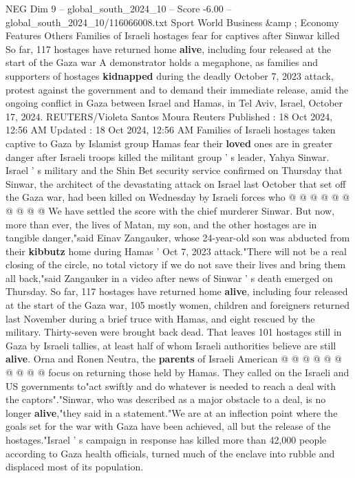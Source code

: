 \begin{textsample}{NEG Dim 9 – global\_south\_2024\_10 – Score -6.00 – global\_south\_2024\_10/116066008.txt}  \label{ex:f9_neg_277}
Sport World Business \&amp ; Economy Features Others Families of Israeli hostages fear for captives after Sinwar killed So far, 117 hostages have returned home \textbf{alive}, including four released at the start of the Gaza war A demonstrator holds a megaphone, as families and supporters of hostages \textbf{kidnapped} during the deadly October 7, 2023 attack, protest against the government and to demand their immediate release, amid the ongoing conflict in Gaza between Israel and Hamas, in Tel Aviv, Israel, October 17, 2024.
REUTERS/Violeta Santos Moura Reuters Published : 18 Oct 2024, 12:56 AM Updated : 18 Oct 2024, 12:56 AM Families of Israeli hostages taken captive to Gaza by Islamist group Hamas fear their \textbf{loved} ones are in greater danger after Israeli troops killed the militant group ' s leader, Yahya Sinwar.
Israel ' s military and the Shin Bet security service confirmed on Thursday that Sinwar, the architect of the devastating attack on Israel last October that set off the Gaza war, had been killed on Wednesday by Israeli forces who @ @ @ @ @ @ @ @ @ @ We have settled the score with the chief murderer Sinwar.
But now, more than ever, the lives of Matan, my son, and the other hostages are in tangible danger,"said Einav Zangauker, whose 24-year-old son was abducted from their \textbf{kibbutz} home during Hamas ' Oct 7, 2023 attack."There will not be a real closing of the circle, no total victory if we do not save their lives and bring them all back,"said Zangauker in a video after news of Sinwar ' s death emerged on Thursday.
So far, 117 hostages have returned home \textbf{alive}, including four released at the start of the Gaza war, 105 mostly women, children and foreigners returned last November during a brief truce with Hamas, and eight rescued by the military.
Thirty-seven were brought back dead.
That leaves 101 hostages still in Gaza by Israeli tallies, at least half of whom Israeli authorities believe are still \textbf{alive}.
Orna and Ronen Neutra, the \textbf{parents} of Israeli American @ @ @ @ @ @ @ @ @ @ focus on returning those held by Hamas.
They called on the Israeli and US governments to"act swiftly and do whatever is needed to reach a deal with the captors"."Sinwar, who was described as a major obstacle to a deal, is no longer \textbf{alive},"they said in a statement."We are at an inflection point where the goals set for the war with Gaza have been achieved, all but the release of the hostages."Israel ' s campaign in response has killed more than 42,000 people according to Gaza health officials, turned much of the enclave into rubble and displaced most of its population.

\end{textsample}
